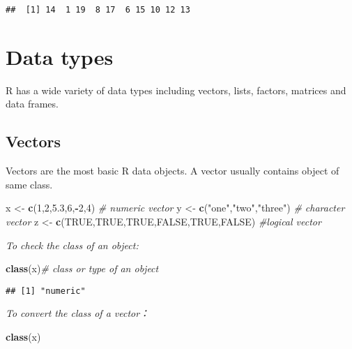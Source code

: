 \documentclass[]{book}
\newenvironment{Shaded}{\begin{snugshade}}{\end{snugshade}}
\newcommand{\KeywordTok}[1]{\textcolor[rgb]{0.13,0.29,0.53}{\textbf{#1}}}
\newcommand{\DecValTok}[1]{\textcolor[rgb]{0.00,0.00,0.81}{#1}}
\newcommand{\FloatTok}[1]{\textcolor[rgb]{0.00,0.00,0.81}{#1}}
\newcommand{\StringTok}[1]{\textcolor[rgb]{0.31,0.60,0.02}{#1}}
\newcommand{\CommentTok}[1]{\textcolor[rgb]{0.56,0.35,0.01}{\textit{#1}}}
\newcommand{\OtherTok}[1]{\textcolor[rgb]{0.56,0.35,0.01}{#1}}
\newcommand{\OperatorTok}[1]{\textcolor[rgb]{0.81,0.36,0.00}{\textbf{#1}}}
\newcommand{\NormalTok}[1]{#1}
\theoremstyle{definition}
\theoremstyle{definition}
\theoremstyle{definition}
\theoremstyle{remark}
\begin{document}
\begin{verbatim}
##  [1] 14  1 19  8 17  6 15 10 12 13
\end{verbatim}

\section{Data types}\label{data-types}

R has a wide variety of data types including vectors, lists, factors,
matrices and data frames.

\subsection{Vectors}\label{vectors}

Vectors are the most basic R data objects. A vector usually contains
object of same class.

\begin{Shaded}
\begin{Highlighting}[]
\NormalTok{x <-}\StringTok{ }\KeywordTok{c}\NormalTok{(}\DecValTok{1}\NormalTok{,}\DecValTok{2}\NormalTok{,}\FloatTok{5.3}\NormalTok{,}\DecValTok{6}\NormalTok{,}\OperatorTok{-}\DecValTok{2}\NormalTok{,}\DecValTok{4}\NormalTok{) }\CommentTok{# numeric vector}
\NormalTok{y <-}\StringTok{ }\KeywordTok{c}\NormalTok{(}\StringTok{"one"}\NormalTok{,}\StringTok{"two"}\NormalTok{,}\StringTok{"three"}\NormalTok{) }\CommentTok{# character vector}
\NormalTok{z <-}\StringTok{ }\KeywordTok{c}\NormalTok{(}\OtherTok{TRUE}\NormalTok{,}\OtherTok{TRUE}\NormalTok{,}\OtherTok{TRUE}\NormalTok{,}\OtherTok{FALSE}\NormalTok{,}\OtherTok{TRUE}\NormalTok{,}\OtherTok{FALSE}\NormalTok{) }\CommentTok{#logical vector}
\end{Highlighting}
\end{Shaded}

\emph{To check the class of an object:}

\begin{Shaded}
\begin{Highlighting}[]
\KeywordTok{class}\NormalTok{(x)}\CommentTok{# class or type of an object}
\end{Highlighting}
\end{Shaded}

\begin{verbatim}
## [1] "numeric"
\end{verbatim}

\emph{To convert the class of a vector：}

\begin{Shaded}
\begin{Highlighting}[]
\KeywordTok{class}\NormalTok{(x)}
\end{Highlighting}
\end{Shaded}
\end{document}
